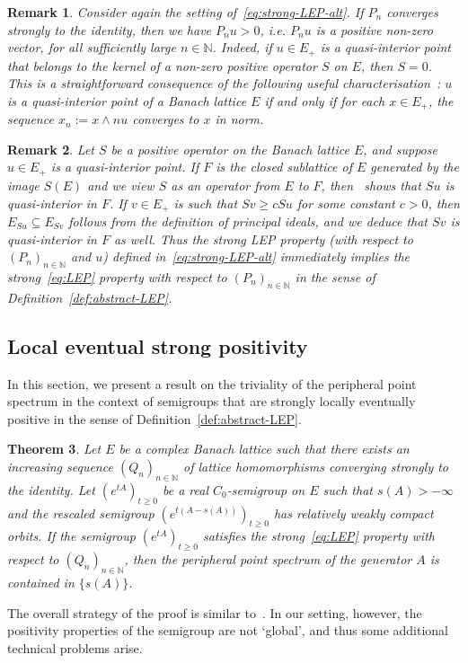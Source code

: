 \documentclass[sn-mathphys]{sn-jnl}%
\theoremstyle{thmstyleone}
\newtheorem{theorem}{Theorem}[section]
\theoremstyle{thmstylethree}
\newtheorem{remark}[theorem]{Remark}
\newcommand{\NN}{\mathbb{N}}
\begin{document}
\begin{remark}
	\label{rmk:quasi-int}
	Consider again the setting of~\eqref{eq:strong-LEP-alt}. If $P_n$ converges strongly to the identity, then we have $P_n u>0$, i.e. $P_n u$ is a positive \emph{non-zero} vector, for all sufficiently large $n\in\NN$. Indeed, if $u\in E_+$ is a quasi-interior point that belongs to the kernel of a non-zero positive operator $S$ on $E$, then $S=0$. This is a straightforward consequence of the following useful characterisation~\cite[II Theorem 6.3]{Sch}: $u$ is a quasi-interior point of a Banach lattice $E$ if and only if for each $x\in E_+$, the sequence $x_n := x\wedge nu$ converges to $x$ in norm.
\end{remark}

\begin{remark}
	Let $S$ be a positive operator on the Banach lattice $E$, and suppose $u\in E_+$ is a quasi-interior point. If $F$ is the closed sublattice of $E$ generated by the image $S(E)$ and we view $S$ as an operator from $E$ to $F$, then~\cite[II Proposition 6.4]{Sch} shows that $Su$ is quasi-interior in $F$. If $v\in E_+$ is such that $Sv\ge cSu$ for some constant $c>0$, then $E_{Su}\subseteq E_{Sv}$ follows from the definition of principal ideals, and we deduce that $Sv$ is quasi-interior in $F$ as well. Thus the strong LEP property (with respect to $(P_n)_{n\in\NN}$ and $u$) defined in~\eqref{eq:strong-LEP-alt} immediately implies the strong~\eqref{eq:LEP} property with respect to $(P_n)_{n\in\NN}$ in the sense of Definition~\ref{def:abstract-LEP}.
\end{remark}

\subsection{Local eventual strong positivity}
\label{sec:LEP-strong}
In this section, we present a result on the triviality of the peripheral point spectrum in the context of semigroups that are strongly locally eventually positive in the sense of Definition~\ref{def:abstract-LEP}.
\begin{theorem}
	\label{thm:strong-pos}
	Let $E$ be a complex Banach lattice such that there exists an increasing sequence $(Q_n)_{n\in\NN}$ of lattice homomorphisms converging strongly to the identity. Let $(e^{tA})_{t\ge 0}$ be a real $C_0$-semigroup on $E$ such that $s(A)>-\infty$ and the rescaled semigroup $(e^{t(A-s(A))})_{t\ge 0}$ has relatively weakly compact orbits. If the semigroup $(e^{tA})_{t\ge 0}$ satisfies the \emph{strong}~\eqref{eq:LEP} property with respect to $(Q_n)_{n\in\NN}$, then the peripheral point spectrum of the generator $A$ is contained in $\{s(A)\}$.
\end{theorem}
The overall strategy of the proof is similar to~\cite[Theorem 6.3.2]{GTh}. In our setting, however, the positivity properties of the semigroup are not `global', and thus some additional technical problems arise.
\end{document}
